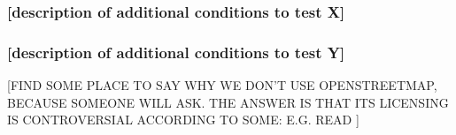     \subsubsection{{[}description of additional conditions to test X{]}}
    \subsubsection{{[}description of additional conditions to test Y{]}}

[FIND SOME PLACE TO SAY WHY WE DON'T USE OPENSTREETMAP, BECAUSE SOMEONE WILL ASK. THE ANSWER IS THAT ITS LICENSING IS CONTROVERSIAL ACCORDING TO SOME: E.G. READ \cite{CentreforSpatialLawandPolicy:2014tx}]
    

